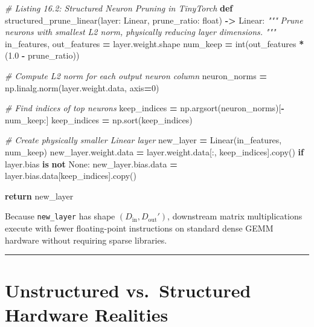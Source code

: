 \documentclass[
  letterpaper,
]{scrbook}
\newenvironment{Shaded}{\begin{snugshade}}{\end{snugshade}}
\newcommand{\BuiltInTok}[1]{#1}
\newcommand{\CommentTok}[1]{\textcolor[rgb]{0.56,0.35,0.01}{\textit{#1}}}
\newcommand{\ControlFlowTok}[1]{\textcolor[rgb]{0.13,0.29,0.53}{\textbf{#1}}}
\newcommand{\DecValTok}[1]{\textcolor[rgb]{0.00,0.00,0.81}{#1}}
\newcommand{\FloatTok}[1]{\textcolor[rgb]{0.00,0.00,0.81}{#1}}
\newcommand{\KeywordTok}[1]{\textcolor[rgb]{0.13,0.29,0.53}{\textbf{#1}}}
\newcommand{\NormalTok}[1]{#1}
\newcommand{\OperatorTok}[1]{\textcolor[rgb]{0.81,0.36,0.00}{\textbf{#1}}}
\newcommand{\VariableTok}[1]{\textcolor[rgb]{0.00,0.00,0.00}{#1}}
\begin{document}
\begin{Shaded}
\begin{Highlighting}[]
\CommentTok{\# Listing 16.2: Structured Neuron Pruning in TinyTorch}
\KeywordTok{def}\NormalTok{ structured\_prune\_linear(layer: Linear, prune\_ratio: }\BuiltInTok{float}\NormalTok{) }\OperatorTok{{-}\textgreater{}}\NormalTok{ Linear:}
    \CommentTok{"""}
\CommentTok{    Prune neurons with smallest L2 norm, physically reducing layer dimensions.}
\CommentTok{    """}
\NormalTok{    in\_features, out\_features }\OperatorTok{=}\NormalTok{ layer.weight.shape}
\NormalTok{    num\_keep }\OperatorTok{=} \BuiltInTok{int}\NormalTok{(out\_features }\OperatorTok{*}\NormalTok{ (}\FloatTok{1.0} \OperatorTok{{-}}\NormalTok{ prune\_ratio))}

    \CommentTok{\# Compute L2 norm for each output neuron column}
\NormalTok{    neuron\_norms }\OperatorTok{=}\NormalTok{ np.linalg.norm(layer.weight.data, axis}\OperatorTok{=}\DecValTok{0}\NormalTok{)}

    \CommentTok{\# Find indices of top neurons}
\NormalTok{    keep\_indices }\OperatorTok{=}\NormalTok{ np.argsort(neuron\_norms)[}\OperatorTok{{-}}\NormalTok{num\_keep:]}
\NormalTok{    keep\_indices }\OperatorTok{=}\NormalTok{ np.sort(keep\_indices)}

    \CommentTok{\# Create physically smaller Linear layer}
\NormalTok{    new\_layer }\OperatorTok{=}\NormalTok{ Linear(in\_features, num\_keep)}
\NormalTok{    new\_layer.weight.data }\OperatorTok{=}\NormalTok{ layer.weight.data[:, keep\_indices].copy()}
    \ControlFlowTok{if}\NormalTok{ layer.bias }\KeywordTok{is} \KeywordTok{not} \VariableTok{None}\NormalTok{:}
\NormalTok{        new\_layer.bias.data }\OperatorTok{=}\NormalTok{ layer.bias.data[keep\_indices].copy()}

    \ControlFlowTok{return}\NormalTok{ new\_layer}
\end{Highlighting}
\end{Shaded}

Because \texttt{new\_layer} has shape
\((D_{\text{in}}, D_{\text{out}}')\), downstream matrix multiplications
execute with fewer floating-point instructions on standard dense GEMM
hardware without requiring sparse libraries.

\begin{center}\rule{0.5\linewidth}{0.5pt}\end{center}

\section{Unstructured vs.~Structured Hardware
Realities}\label{unstructured-vs.-structured-hardware-realities}
\end{document}
